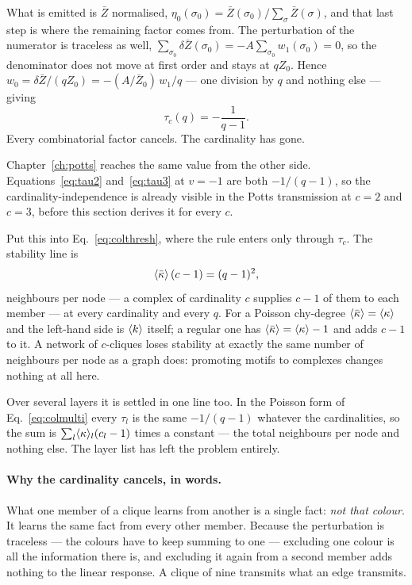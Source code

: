 What is emitted is $\bar{Z}$ normalised, $\eta_{0}(\sigma_{0})=\bar{Z}(\sigma_{0})/
\sum_{\sigma}\bar{Z}(\sigma)$, and that last step is where the remaining factor comes
from. The perturbation of the numerator is traceless as well,
$\sum_{\sigma_{0}}\delta \bar{Z}(\sigma_{0})=-A\sum_{\sigma_{0}}w_{1}(\sigma_{0})=0$,
so the denominator does not move at first order and stays at $qZ_{0}$. Hence
$w_{0}=\delta\bar{Z}/(qZ_{0})=-(A/\bar{Z}_{0})\,w_{1}/q$ --- one division by $q$ and nothing
else --- giving
\begin{equation}
  \tau_{c}(q)=-\frac{1}{q-1}.
  \label{eq:taucol}
\end{equation}
Every combinatorial factor cancels. The cardinality has gone.

Chapter~\ref{ch:potts} reaches the same value from the other side.
Equations~\eqref{eq:tau2} and~\eqref{eq:tau3} at $v=-1$ are both $-1/(q-1)$,
so the cardinality-independence is already visible in the Potts transmission at
$c=2$ and $c=3$, before this section derives it for every $c$.

Put this into Eq.~\eqref{eq:colthresh}, where the rule enters only through
$\tau_{c}$. The stability line is
\begin{equation}
  \langle \bar\kappa \rangle\,(c-1)=(q-1)^{2},
  \label{eq:colproperline}
\end{equation}
neighbours per node --- a complex of cardinality $c$ supplies $c-1$ of them to
each member --- at every cardinality and every $q$. For a Poisson chy-degree
$\langle \bar\kappa \rangle=\langle \kappa \rangle$ and the left-hand side is $\langle k \rangle$ itself; a regular
one has $\langle \bar\kappa \rangle=\langle \kappa \rangle-1$ and adds $c-1$ to it. A network of
$c$-cliques loses stability at exactly the same number of neighbours per node as
a graph does: promoting motifs to complexes changes nothing at all here.

Over several layers it is settled in one line too. In the Poisson form of
Eq.~\eqref{eq:colmulti} every $\tau_{l}$ is the same $-1/(q-1)$ whatever the
cardinalities, so the sum
is $\sum_{l}\langle \kappa \rangle_{l}(c_{l}-1)$ times a constant --- the total
neighbours per node and nothing else. The layer list has left the problem
entirely.

\paragraph{Why the cardinality cancels, in words.} What one member
of a clique learns from another is a single fact: \emph{not that colour}. It
learns the same fact from every other member. Because the perturbation is
traceless --- the colours have to keep summing to one --- excluding one colour
is all the information there is, and excluding it again from a second member
adds nothing to the linear response. A clique of nine transmits what an edge
transmits.

